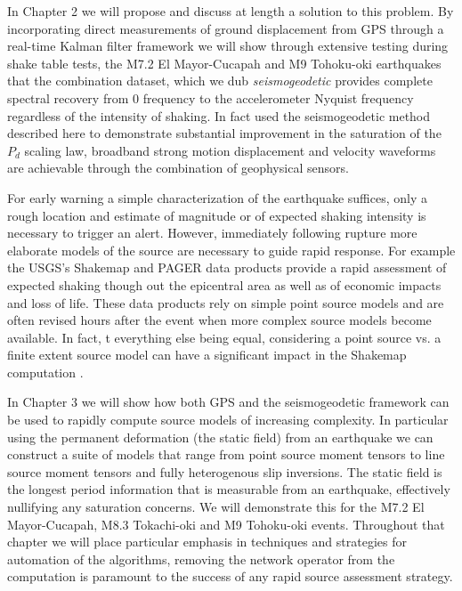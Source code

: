 In Chapter 2 we will propose and discuss at length a solution to this problem. By incorporating direct measurements of ground displacement from GPS through a real-time Kalman filter framework we will show through extensive testing during shake table tests, the M7.2 El Mayor-Cucapah and M9 Tohoku-oki earthquakes that the combination dataset, which we dub \textit{seismogeodetic} provides complete spectral recovery from 0 frequency to the accelerometer Nyquist frequency regardless of the intensity of shaking. In fact \citep{Crowell2013} used the seismogeodetic method described here to demonstrate substantial improvement in the saturation of the $P_d$ scaling law, broadband strong motion displacement and velocity waveforms are achievable through the combination of geophysical sensors.

For early warning a simple characterization of the earthquake suffices, only a rough location and estimate of magnitude or of expected shaking intensity is necessary to trigger an alert. However, immediately following rupture more elaborate models of the source are necessary to guide rapid response. For example the USGS's Shakemap \citep{allen2009shake} and PAGER \citep{jaiswal2010} data products provide a rapid assessment of expected shaking though out the epicentral area as well as of economic impacts and loss of life. These data products rely on simple point source models and are often revised hours after the event when more complex source models become available. In fact, t everything else being equal, considering a point source vs. a finite extent source model can have a significant impact in the Shakemap computation \citep{colombelli2013}.

In Chapter 3 we will show how both GPS and the seismogeodetic framework can be used to rapidly compute source models of increasing complexity. In particular using the permanent deformation (the static field) from an earthquake we can construct a suite of models that range from point source moment tensors to line source moment tensors and fully heterogenous slip inversions. The static field is the longest period information that is measurable from an earthquake, effectively nullifying any saturation concerns.  We will demonstrate this for the M7.2 El Mayor-Cucapah, M8.3 Tokachi-oki and M9 Tohoku-oki events. Throughout that chapter we will place particular emphasis in techniques and strategies for automation of the algorithms, removing the network operator from the computation is paramount to the success of any rapid source assessment strategy.

